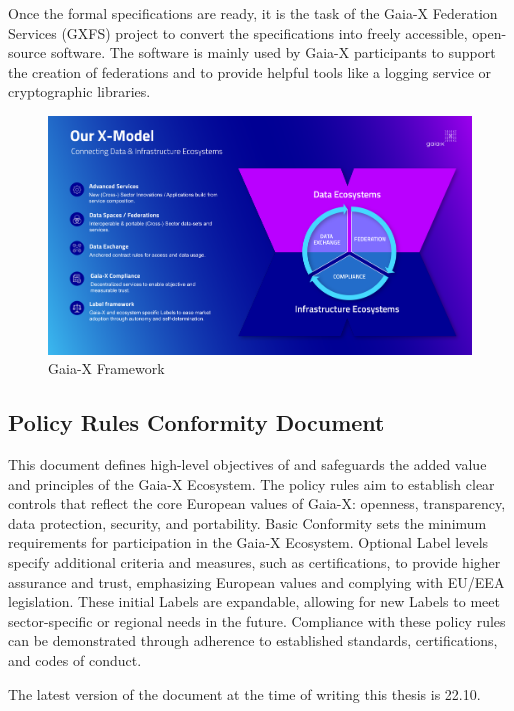 Once the formal specifications are ready, it is the task of the Gaia-X Federation Services (GXFS) project to convert the specifications into freely accessible, open-source software\cite{gxfs}.
The software is mainly used by Gaia-X participants to support the creation of federations and to provide helpful tools like a logging service or cryptographic libraries.

\begin{figure}
    \centering
    \includegraphics[width=\textwidth]{figures/x-model.png}
    \caption{Gaia-X Framework~\cite{gaiax}}\label{fig:gaiax-x-model}
\end{figure}

\subsection{Policy Rules Conformity Document}\label{subsec:policy-rules-conformity-document}

This document defines high-level objectives of and safeguards the added value and principles of the Gaia-X Ecosystem\cite{gaiax_policy_rules}.
The policy rules aim to establish clear controls that reflect the core European values of Gaia-X: openness, transparency, data protection, security, and portability.
Basic Conformity sets the minimum requirements for participation in the Gaia-X Ecosystem.
Optional Label levels specify additional criteria and measures, such as certifications, to provide higher assurance and trust, emphasizing European values and complying with EU/EEA legislation.
These initial Labels are expandable, allowing for new Labels to meet sector-specific or regional needs in the future.
Compliance with these policy rules can be demonstrated through adherence to established standards, certifications, and codes of conduct.

The latest version of the document at the time of writing this thesis is 22.10.

